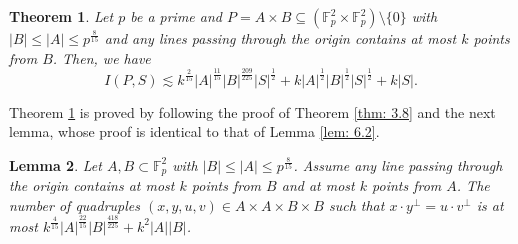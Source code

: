 \documentclass[11pt]{article}
\newtheorem{theorem}{Theorem}[section]
\newtheorem{lemma}[theorem]{Lemma}
\def\Fbb{\mathbb{F}}
\def\l({\left(}
\def\r){\right)}
\def\lv{\left\vert}
\def\rv{\right\vert}
\def\lo{\left\{}
\def\ro{\right\}}
\begin{document}
\begin{theorem}\label{thm: 6.2}
    Let $p$ be a prime and $P=A\times B \subseteq \l( \Fbb_p^2\times \Fbb_p^2 \r) \setminus \{ 0 \}$ with $\lv B\rv \le \lv A\rv \le p^{\frac{8}{15}}$ and any lines passing through the origin contains at most $k$ points from $B$. Then, we have 
    \[ I(P,S) \lesssim k^{\frac{2}{15}}\lv A\rv^{\frac{11}{15}}\lv B\rv^{\frac{209}{225}}  |S|^{\frac{1}{2}}  +k|A|^{\frac{1}{2}}|B|^{\frac{1}{2}}|S|^{\frac{1}{2}} +  k\lv S\rv .\]
\end{theorem}






Theorem \ref{thm: 6.2} is proved by following the proof of Theorem \ref{thm: 3.8} and the next lemma, whose proof is identical to that of Lemma \ref{lem: 6.2}.


\begin{lemma}\label{lem: quad}
    Let $A,B \subset \Fbb_p^2$ with $\lv B\rv \le \lv A \rv \le p^{\frac{8}{15}}$. Assume any line passing through the origin contains at most $k$ points from $B$ and at most $k$ points from $A$. The number of quadruples $(x,y,u,v) \in A\times A \times B \times B $ such that $x\cdot y^\perp =u\cdot v^\perp$ is at most $  k^{\frac{4}{15}}\lv A\rv^{\frac{22}{15}}\lv B\rv^{\frac{418}{225}}  + k^2\lv A\rv\lv B\rv$. 
\end{lemma}
\end{document}
